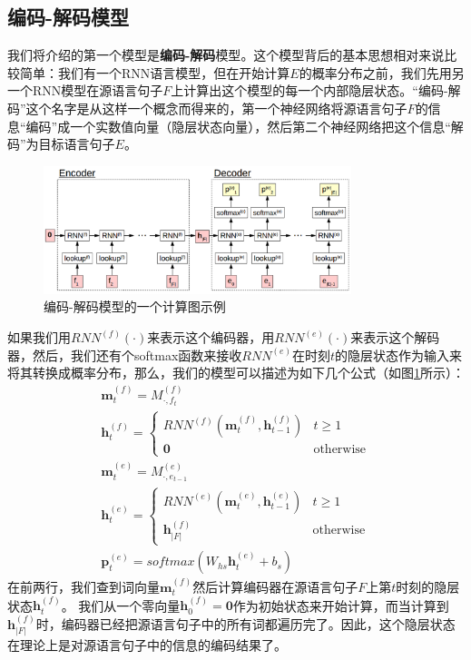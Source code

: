 \documentclass[10pt,a4paper]{ctexart}
\begin{document}
\subsection{编码-解码模型}
我们将介绍的第一个模型是\textbf{编码-解码}模型\cite{chrisman1991learning,forcada1997recursive,kalchbrenner2013recurrent,sutskever2014sequence}。这个模型背后的基本思想相对来说比较简单：我们有一个RNN语言模型，但在开始计算$E$的概率分布之前，我们先用另一个RNN模型在源语言句子$F$上计算出这个模型的每一个内部隐层状态。“编码-解码”这个名字是从这样一个概念而得来的，第一个神经网络将源语言句子$F$的信息“编码”成一个实数值向量（隐层状态向量），然后第二个神经网络把这个信息“解码”为目标语言句子$E$。

\begin{figure}[H]
\centering
\includegraphics[width=0.8\textwidth]{fig21.png}
\caption{编码-解码模型的一个计算图示例}
\label{fig:21}
\end{figure}

如果我们用$RNN^{(f)}(\cdot)$来表示这个编码器，用$RNN^{(e)}(\cdot)$来表示这个解码器，然后，我们还有个softmax函数来接收$RNN^{(e)}$在时刻$t$的隐层状态作为输入来将其转换成概率分布，那么，我们的模型可以描述为如下几个公式（如图\ref{fig:21}所示）：
\[
 \begin{array}{l}
   \textbf{m}_t^{(f)} = M_{\cdot,f_t}^{(f)} \\
   \textbf{h}_t^{(f)} = \left\{ \begin{array}{ll}
      RNN^{(f)}(\textbf{m}_t^{(f)},\textbf{h}_{t-1}^{(f)}) & t \geq 1 \\
      \textbf{0} & \textrm{otherwise}
      \end{array} \right. \\
   \textbf{m}_t^{(e)} = M_{\cdot,e_{t-1}}^{(e)} \\
   \textbf{h}_t^{(e)} = \left\{ \begin{array}{ll}
      RNN^{(e)}(\textbf{m}_t^{(e)},\textbf{h}_{t-1}^{(e)}) & t \geq 1 \\
      \textbf{h}_{|F|}^{(f)} & \textrm{otherwise}
      \end{array} \right. \\
   \textbf{p}_t^{(e)} = softmax(W_{hs}\textbf{h}_t^{(e)} + b_s)
 \end{array}
\]
在前两行，我们查到词向量$\textbf{m}_t^{(f)}$然后计算编码器在源语言句子$F$上第$t$时刻的隐层状态$\textbf{h}_t^{(f)}$。
我们从一个零向量$\textbf{h}_0^{(f)}=\textbf{0}$作为初始状态来开始计算，而当计算到$\textbf{h}_{|F|}^{(f)}$时，编码器已经把源语言句子中的所有词都遍历完了。因此，这个隐层状态在理论上是对源语言句子中的信息的编码结果了。
\end{document}
